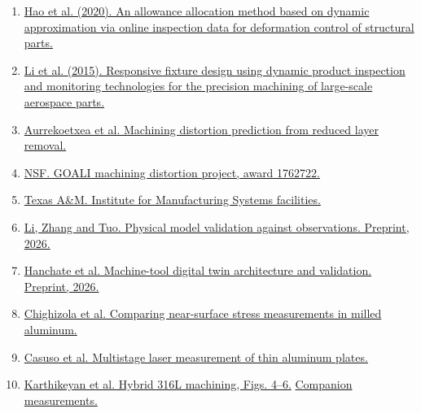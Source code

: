 \documentclass[11pt,letterpaper]{article}
\begin{document}
\begin{enumerate}
\small\setlength{\itemsep}{0pt}
\item \href{https://doi.org/10.1016/j.cja.2020.03.038}{Hao et al. (2020). An allowance allocation method based on dynamic approximation via online inspection data for deformation control of structural parts.}
\item \href{https://doi.org/10.1016/j.cirp.2015.04.025}{Li et al. (2015). Responsive fixture design using dynamic product inspection and monitoring technologies for the precision machining of large-scale aerospace parts.}
\item \href{https://doi.org/10.3390/jmmp8010009}{Aurrekoetxea et al. Machining distortion prediction from reduced layer removal.}
\item \href{https://www.nsf.gov/awardsearch/showAward?AWD_ID=1762722}{NSF. GOALI machining distortion project, award 1762722.}
\item \href{https://texasmakes.tamu.edu/facilities/}{Texas A\&M. Institute for Manufacturing Systems facilities.}
\item \href{https://arxiv.org/abs/2604.17144}{Li, Zhang and Tuo. Physical model validation against observations. Preprint, 2026.}
\item \href{https://ssrn.com/abstract=7243783}{Hanchate et al. Machine-tool digital twin architecture and validation. Preprint, 2026.}
\item \href{https://doi.org/10.1007/s11340-021-00734-5}{Chighizola et al. Comparing near-surface stress measurements in milled aluminum.}
\item \href{https://link.springer.com/article/10.1007/s00170-026-17756-9}{Casuso et al. Multistage laser measurement of thin aluminum plates.}
\item \href{https://arxiv.org/abs/2304.08658v4}{Karthikeyan et al. Hybrid 316L machining, Figs. 4--6.} \href{https://data.mendeley.com/datasets/bfnnn86hhn/1}{Companion measurements.}
\end{enumerate}
\end{document}
